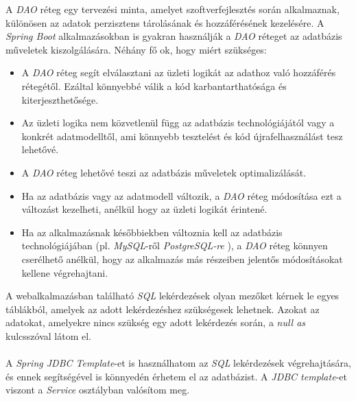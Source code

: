 
A \textit{DAO} \cite{DAO} réteg egy tervezési minta, amelyet szoftverfejlesztés során alkalmaznak, különösen az adatok perzisztens tárolásának és hozzáférésének kezelésére. A \textit{Spring Boot} \cite{spring_boot} alkalmazásokban is gyakran használják a \textit{DAO} \cite{DAO} réteget az adatbázis műveletek kiszolgálására. Néhány fő ok, hogy miért szükséges:

\begin{itemize}

\item{} A \textit{DAO} réteg segít elválasztani az üzleti logikát az adathoz való hozzáférés rétegétől. Ezáltal könnyebbé válik a kód karbantarthatósága és kiterjeszthetősége. 

\item{} Az üzleti logika nem közvetlenül függ az adatbázis technológiájától vagy a konkrét adatmodelltől, ami könnyebb tesztelést és kód újrafelhasználást tesz lehetővé. 

\item{} A \textit{DAO} réteg lehetővé teszi az adatbázis műveletek optimalizálását. 

\item{} Ha az adatbázis vagy az adatmodell változik, a \textit{DAO} réteg módosítása ezt a változást kezelheti, anélkül hogy az üzleti logikát érintené. 

\item{} Ha az alkalmazásnak későbbiekben változnia kell az adatbázis technológiájában (pl. \textit{MySQL}-ről \cite{MySQL} \textit{PostgreSQL-re} \cite{PostgreSQL}), a \textit{DAO} réteg könnyen cserélhető anélkül, hogy az alkalmazás más részeiben jelentős módosításokat kellene végrehajtani.

\end{itemize}

A webalkalmazásban található \textit{SQL} \cite{SQL} lekérdezések olyan mezőket kérnek le egyes táblákból, amelyek az adott lekérdezéshez szükségesek lehetnek. Azokat az adatokat, amelyekre nincs szükség egy adott lekérdezés során, a \textit{null as} kulcsszóval látom el.\\
\\
A \textit{Spring JDBC Template}-et \cite{JdbcTemplate} is használhatom az \textit{SQL} lekérdezések végrehajtására, és ennek segítségével is könnyedén érhetem el az adatbázist. A \textit{JDBC template}-et viszont a \textit{Service} osztályban valósítom meg.


